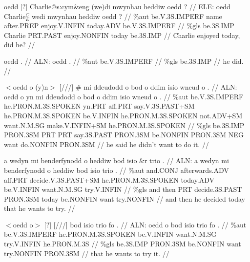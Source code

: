 \documentclass[a4paper,10pt]{article}
\begin{document}
\ex
\begingl[lingstyle=gergl]
\glchat oedd [?] Charlie@s:cym\&eng (we)di mwynhau heddiw oedd ? //
\glsurface ELE:  oedd Charlie$^{C}_{E}$ wedi mwynhau heddiw oedd ?  //
\glauto \%aut  be{\scriptsize .V.3S.IMPERF} name after{\scriptsize .PREP} enjoy{\scriptsize .V.INFIN} today{\scriptsize .ADV} be{\scriptsize .V.3S.IMPERF}   //
\glmanual \%gls  be{\scriptsize .3S.IMP} Charlie PRT{\scriptsize .PAST} enjoy{\scriptsize .NONFIN} today be{\scriptsize .3S.IMP}   //
\gleng Charlie enjoyed today, did he? //
\endgl
\xe

\ex
\begingl[lingstyle=gergl]
\glchat oedd . //
\glsurface ALN:  oedd .  //
\glauto \%aut  be{\scriptsize .V.3S.IMPERF}   //
\glmanual \%gls  be{\scriptsize .3S.IMP}   //
\gleng he did. //
\endgl
\xe

\ex
\begingl[lingstyle=gergl]
\glchat $<$oedd o (y)n$>$ [///] \# mi ddeudodd o bod o ddim isio wneud o . //
\glsurface ALN:  oedd o yn mi ddeudodd o bod o ddim isio wneud o .  //
\glauto \%aut  be{\scriptsize .V.3S.IMPERF} he{\scriptsize .PRON.M.3S.SPOKEN} yn{\scriptsize .PRT} aff{\scriptsize .PRT} say{\scriptsize .V.3S.PAST+SM} he{\scriptsize .PRON.M.3S.SPOKEN} be{\scriptsize .V.INFIN} he{\scriptsize .PRON.M.3S.SPOKEN} not{\scriptsize .ADV+SM} want{\scriptsize .N.M.SG} make{\scriptsize .V.INFIN+SM} he{\scriptsize .PRON.M.3S.SPOKEN}   //
\glmanual \%gls  be{\scriptsize .3S.IMP} PRON{\scriptsize .3SM} PRT PRT say{\scriptsize .3S.PAST} PRON{\scriptsize .3SM} be{\scriptsize .NONFIN} PRON{\scriptsize .3SM} NEG want do{\scriptsize .NONFIN} PRON{\scriptsize .3SM}   //
\gleng he said he didn't want to do it. //
\endgl
\xe

\ex
\begingl[lingstyle=gergl]
\glchat a wedyn mi benderfynodd o heddiw bod isio \&r trio . //
\glsurface ALN:  a wedyn mi benderfynodd o heddiw bod isio trio .  //
\glauto \%aut  and{\scriptsize .CONJ} afterwards{\scriptsize .ADV} aff{\scriptsize .PRT} decide{\scriptsize .V.3S.PAST+SM} he{\scriptsize .PRON.M.3S.SPOKEN} today{\scriptsize .ADV} be{\scriptsize .V.INFIN} want{\scriptsize .N.M.SG} try{\scriptsize .V.INFIN}   //
\glmanual \%gls  and then PRT decide{\scriptsize .3S.PAST} PRON{\scriptsize .3SM} today be{\scriptsize .NONFIN} want try{\scriptsize .NONFIN}   //
\gleng and then he decided today that he wants to try. //
\endgl
\xe

\ex
\begingl[lingstyle=gergl]
\glchat $<$oedd o$>$ [?] [///] bod isio trio fo . //
\glsurface ALN:  oedd o bod isio trio fo .  //
\glauto \%aut  be{\scriptsize .V.3S.IMPERF} he{\scriptsize .PRON.M.3S.SPOKEN} be{\scriptsize .V.INFIN} want{\scriptsize .N.M.SG} try{\scriptsize .V.INFIN} he{\scriptsize .PRON.M.3S}   //
\glmanual \%gls  be{\scriptsize .3S.IMP} PRON{\scriptsize .3SM} be{\scriptsize .NONFIN} want try{\scriptsize .NONFIN} PRON{\scriptsize .3SM}   //
\gleng that he wants to try it. //
\endgl
\xe
\end{document}
